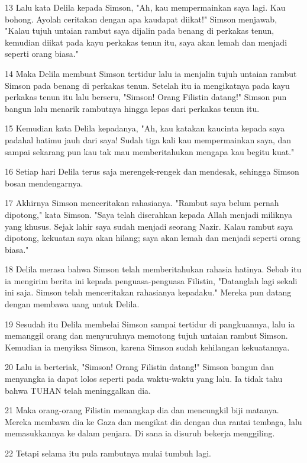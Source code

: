 \par 13 Lalu kata Delila kepada Simson, "Ah, kau mempermainkan saya lagi. Kau bohong. Ayolah ceritakan dengan apa kaudapat diikat!" Simson menjawab, "Kalau tujuh untaian rambut saya dijalin pada benang di perkakas tenun, kemudian diikat pada kayu perkakas tenun itu, saya akan lemah dan menjadi seperti orang biasa."
\par 14 Maka Delila membuat Simson tertidur lalu ia menjalin tujuh untaian rambut Simson pada benang di perkakas tenun. Setelah itu ia mengikatnya pada kayu perkakas tenun itu lalu berseru, "Simson! Orang Filistin datang!" Simson pun bangun lalu menarik rambutnya hingga lepas dari perkakas tenun itu.
\par 15 Kemudian kata Delila kepadanya, "Ah, kau katakan kaucinta kepada saya padahal hatimu jauh dari saya! Sudah tiga kali kau mempermainkan saya, dan sampai sekarang pun kau tak mau memberitahukan mengapa kau begitu kuat."
\par 16 Setiap hari Delila terus saja merengek-rengek dan mendesak, sehingga Simson bosan mendengarnya.
\par 17 Akhirnya Simson menceritakan rahasianya. "Rambut saya belum pernah dipotong," kata Simson. "Saya telah diserahkan kepada Allah menjadi miliknya yang khusus. Sejak lahir saya sudah menjadi seorang Nazir. Kalau rambut saya dipotong, kekuatan saya akan hilang; saya akan lemah dan menjadi seperti orang biasa."
\par 18 Delila merasa bahwa Simson telah memberitahukan rahasia hatinya. Sebab itu ia mengirim berita ini kepada penguasa-penguasa Filistin, "Datanglah lagi sekali ini saja. Simson telah menceritakan rahasianya kepadaku." Mereka pun datang dengan membawa uang untuk Delila.
\par 19 Sesudah itu Delila membelai Simson sampai tertidur di pangkuannya, lalu ia memanggil orang dan menyuruhnya memotong tujuh untaian rambut Simson. Kemudian ia menyiksa Simson, karena Simson sudah kehilangan kekuatannya.
\par 20 Lalu ia berteriak, "Simson! Orang Filistin datang!" Simson bangun dan menyangka ia dapat lolos seperti pada waktu-waktu yang lalu. Ia tidak tahu bahwa TUHAN telah meninggalkan dia.
\par 21 Maka orang-orang Filistin menangkap dia dan mencungkil biji matanya. Mereka membawa dia ke Gaza dan mengikat dia dengan dua rantai tembaga, lalu memasukkannya ke dalam penjara. Di sana ia disuruh bekerja menggiling.
\par 22 Tetapi selama itu pula rambutnya mulai tumbuh lagi.
